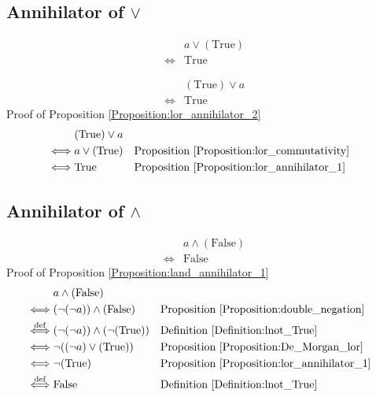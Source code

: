 \subsection{Annihilator of $\lor$}
\begin{prop}
\label{Proposition:lor_annihilator_1}
\begin{align*}
& a \lor (\text{True}) \\
\iff & \text{True}
\end{align*}
\end{prop}

\begin{prop}
\label{Proposition:lor_annihilator_2}
\begin{align*}
& (\text{True}) \lor a \\
\iff & \text{True}
\end{align*}
Proof of Proposition \ref{Proposition:lor_annihilator_2}
\begin{align*}
& (\text{True}) \lor a \\
\iff & a \lor (\text{True})
& & \text{Proposition \ref{Proposition:lor_commutativity}} \\
\iff & \text{True}
& & \text{Proposition \ref{Proposition:lor_annihilator_1}} \\
\end{align*}
\end{prop}

\subsection{Annihilator of $\land$}
\begin{prop}
\label{Proposition:land_annihilator_1}
\begin{align*}
& a \land (\text{False}) \\
\iff & \text{False}
\end{align*}
Proof of Proposition \ref{Proposition:land_annihilator_1}
\begin{align*}
& a \land (\text{False}) \\
\iff & (\lnot (\lnot a)) \land (\text{False})
& & \text{Proposition \ref{Proposition:double_negation}} \\
\overset{\operatorname{def}}{\iff} & (\lnot (\lnot a)) \land (\lnot (\text{True}))
& & \text{Definition \ref{Definition:lnot_True}} \\
\iff & \lnot ((\lnot a) \lor (\text{True}))
& & \text{Proposition \ref{Proposition:De_Morgan_lor}} \\
\iff & \lnot (\text{True})
& & \text{Proposition \ref{Proposition:lor_annihilator_1}} \\
\overset{\operatorname{def}}{\iff} & \text{False}
& & \text{Definition \ref{Definition:lnot_True}} \\
\end{align*}
\end{prop}

